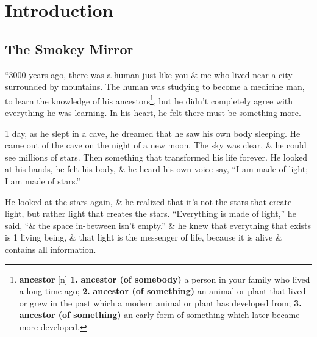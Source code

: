 \documentclass[oneside]{book}
\numberwithin{equation}{section}
\begin{document}
\section*{Introduction}

\subsection*{The Smokey Mirror}
``3000 years ago, there was a human just like you \& me who lived near a city surrounded by mountains. The human was studying to become a medicine man, to learn the knowledge of his ancestors\footnote{\textbf{ancestor} [n] \textbf{1.} \textbf{ancestor (of somebody)} a person in your family who lived a long time ago; \textbf{2.} \textbf{ancestor (of something)} an animal or plant that lived or grew in the past which a modern animal or plant has developed from; \textbf{3.} \textbf{ancestor (of something)} an early form of something which later became more developed.}, but he didn't completely agree with everything he was learning. In his heart, he felt there must be something more.

1 day, as he slept in a cave, he dreamed that he saw his own body sleeping. He came out of the cave on the night of a new moon. The sky was clear, \& he could see millions of stars. Then something  that transformed his life forever. He looked at his hands, he felt his body, \& he heard his own voice say, ``I am made of light; I am made of stars.''

He looked at the stars again, \& he realized that it's not the stars that create light, but rather light that creates the stars. ``Everything is made of light,'' he said, ``\& the space in-between isn't empty.'' \& he knew that everything that exists is 1 living being, \& that light is the messenger of life, because it is alive \& contains all information.
\end{document}
